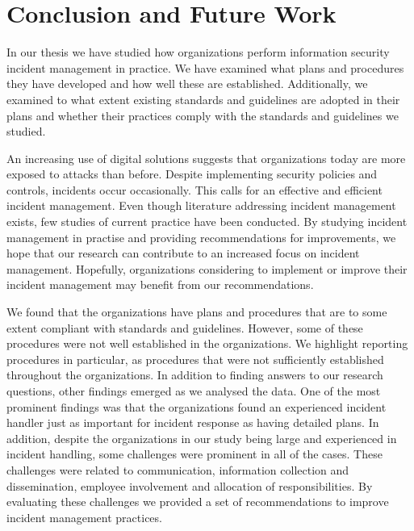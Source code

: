 \chapter{Conclusion and Future Work}
\label{chp:conclusion}

In our thesis we have studied how organizations perform information security incident management in practice. We have examined what plans and procedures they have developed and how well these are established. Additionally, we examined to what extent existing standards and guidelines are adopted in their plans and whether their practices comply with the standards and guidelines we studied.

An increasing use of digital solutions suggests that organizations today are more exposed to attacks than before. Despite implementing security policies and controls, incidents occur occasionally. This calls for an effective and efficient incident management. Even though literature addressing incident management exists, few studies of current practice have been conducted. By studying incident management in practise and providing recommendations for improvements, we hope that our research can contribute to an increased focus on incident management. Hopefully, organizations considering to implement or improve their incident management may benefit from our recommendations.

We found that the organizations have plans and procedures that are to some extent compliant with standards and guidelines. However, some of these procedures were not well established in the organizations. We highlight reporting procedures in particular, as procedures that were not sufficiently established throughout the organizations. In addition to finding answers to our research questions, other findings emerged as we analysed the data. One of the most prominent findings was that the organizations found an experienced incident handler just as important for incident response as having detailed plans. In addition, despite the organizations in our study being large and experienced in incident handling, some challenges were prominent in all of the cases. These challenges were related to communication, information collection and dissemination, employee involvement and allocation of responsibilities. By evaluating these challenges we provided a set of recommendations to improve incident management practices.

